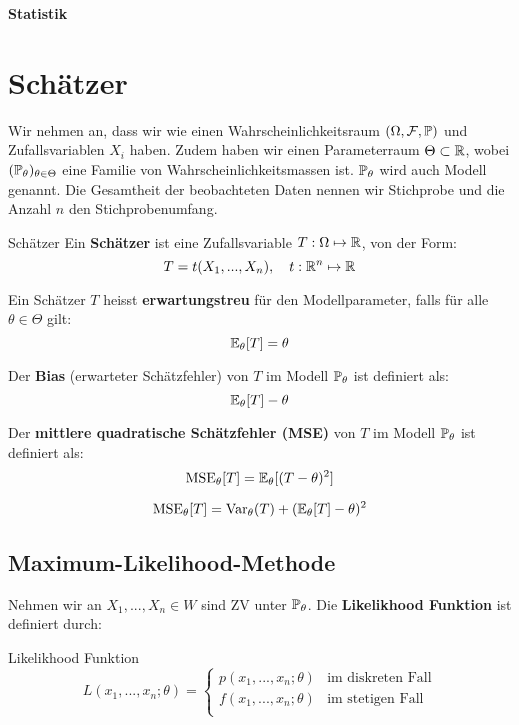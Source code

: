 \begin{center}
	\Large{\textbf{Statistik}}
\end{center}

\section{Schätzer}

Wir nehmen an, dass wir wie einen Wahrscheinlichkeitsraum $(\Omega, \mathcal{F}, \mathbb{P})$ und Zufallsvariablen $X_i$ haben. Zudem haben wir einen Parameterraum $\Theta \subset \mathbb{R}$, wobei $(\mathbb{P}_\theta)_{\theta \in \Theta}$ eine Familie von Wahrscheinlichkeitsmassen ist. $\mathbb{P}_\theta$ wird auch Modell genannt. Die Gesamtheit der beobachteten Daten nennen wir Stichprobe und die Anzahl $n$ den Stichprobenumfang.

\begin{mainbox}{Schätzer}
    Ein \textbf{Schätzer} ist eine Zufallsvariable $T: \Omega \mapsto \mathbb{R}$, von der Form:
    $$T = t(X_1,...,X_n), \quad t:\mathbb{R}^n \mapsto \mathbb{R}$$
\end{mainbox}

Ein Schätzer $T$ heisst \textbf{erwartungstreu} für den Modellparameter, falls für alle $\theta \in \Theta$ gilt:
$$\mathbb{E}_\theta[T] = \theta$$

Der \textbf{Bias} (erwarteter Schätzfehler) von $T$ im Modell $\mathbb{P}_\theta$ ist definiert als:
$$\mathbb{E}_\theta[T] - \theta$$

Der \textbf{mittlere quadratische Schätzfehler (MSE)} von $T$ im Modell $\mathbb{P}_\theta$ ist definiert als:
$$\text{MSE}_\theta[T] = \mathbb{E}_\theta[(T-\theta)^2]$$

$$\text{MSE}_\theta[T] = \text{Var}_\theta(T) + (\mathbb{E}_\theta[T] - \theta)^2$$





\subsection{Maximum-Likelihood-Methode}

Nehmen wir an $X_1,...,X_n \in W$ sind ZV unter $\mathbb{P}_\theta$. Die \textbf{Likelikhood Funktion} ist definiert durch:
\begin{mainbox}{Likelikhood Funktion}
    $$L(x_1, ..., x_n; \theta) = \begin{cases}
        p(x_1, ..., x_n; \theta) & \text{im diskreten Fall} \\
        f(x_1, ..., x_n; \theta) & \text{im stetigen Fall} \\
        \end{cases}$$
\end{mainbox}

